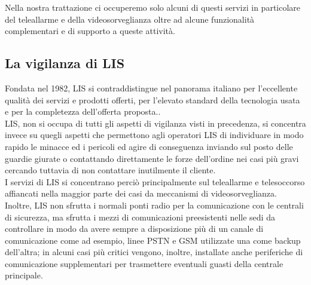 Nella nostra trattazione ci occuperemo solo alcuni di questi servizi in particolare del teleallarme e della videosorveglianza oltre ad alcune funzionalità complementari e di supporto a queste attività.
\subsection{La vigilanza di LIS}
Fondata nel 1982, LIS si contraddistingue nel panorama italiano per l'eccellente qualità dei servizi e prodotti offerti, per l'elevato standard della tecnologia usata e per la completezza dell'offerta proposta.\cite{lis:chisiamo}.\\
LIS, non si occupa di tutti gli aspetti di vigilanza visti in precedenza, si concentra invece su quegli aspetti che permettono agli operatori LIS di individuare in modo rapido le minacce ed i pericoli ed agire di conseguenza inviando sul posto delle guardie giurate o contattando direttamente le forze dell'ordine nei casi più gravi cercando tuttavia di non contattare inutilmente il cliente.\\
I servizi di LIS si concentrano perciò principalmente sul teleallarme e telesoccorso affiancati nella maggior parte dei casi da meccanismi di videosorveglianza. Inoltre, LIS non sfrutta i normali ponti  radio per la comunicazione con le centrali di sicurezza, ma sfrutta i mezzi di comunicazioni preesistenti nelle sedi da controllare in modo da avere sempre a disposizione più di un canale di comunicazione come ad esempio, linee PSTN e GSM utilizzate una come backup dell'altra; in alcuni casi più critici vengono, inoltre, installate anche periferiche di comunicazione supplementari per trasmettere eventuali guasti della centrale principale.
